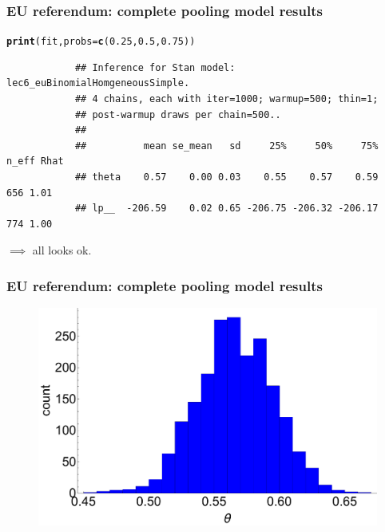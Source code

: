 \documentclass[handout]{beamer}
\makeatletter
\newcommand{\hlnum}[1]{\textcolor[rgb]{0.686,0.059,0.569}{#1}}%
\newcommand{\hlstd}[1]{\textcolor[rgb]{0.345,0.345,0.345}{#1}}%
\newcommand{\hlkwc}[1]{\textcolor[rgb]{0.333,0.667,0.333}{#1}}%
\newcommand{\hlkwd}[1]{\textcolor[rgb]{0.737,0.353,0.396}{\textbf{#1}}}%
\newenvironment{kframe}{%
	\def\at@end@of@kframe{}%
	\ifinner\ifhmode%
	\def\at@end@of@kframe{\end{minipage}}%
\begin{minipage}{\columnwidth}%
	\fi\fi%
	\def\FrameCommand##1{\hskip\@totalleftmargin \hskip-\fboxsep
		\colorbox{shadecolor}{##1}\hskip-\fboxsep
		\hskip-\linewidth \hskip-\@totalleftmargin \hskip\columnwidth}%
	\MakeFramed {\advance\hsize-\width
		\@totalleftmargin\z@ \linewidth\hsize
		\@setminipage}}%
{\par\unskip\endMakeFramed%
	\at@end@of@kframe}
\newenvironment{knitrout}{}{} %
\makeatother
\begin{document}
\begin{frame}[fragile]
	\frametitle{EU referendum: complete pooling model results}
	\begin{knitrout}\scriptsize
		\color{fgcolor}\begin{kframe}
			\begin{alltt}
				\hlkwd{print}\hlstd{(fit,}\hlkwc{probs} \hlstd{=} \hlkwd{c}\hlstd{(}\hlnum{0.25}\hlstd{,} \hlnum{0.5}\hlstd{,} \hlnum{0.75}\hlstd{))}
			\end{alltt}
			\begin{verbatim}
			## Inference for Stan model: lec6_euBinomialHomgeneousSimple.
			## 4 chains, each with iter=1000; warmup=500; thin=1; 
			## post-warmup draws per chain=500..
			## 
			##          mean se_mean   sd     25%     50%     75% n_eff Rhat
			## theta    0.57    0.00 0.03    0.55    0.57    0.59   656 1.01
			## lp__  -206.59    0.02 0.65 -206.75 -206.32 -206.17   774 1.00
			\end{verbatim}
		\end{kframe}
	\end{knitrout}
	
	$\implies$ all looks ok.
\end{frame}

\begin{frame}
	\frametitle{EU referendum: complete pooling model results}
	\begin{figure}[ht]
		\centerline{\includegraphics[width=1\linewidth]{figures/lec6_euHomogeneousPosterior.pdf} }
	\end{figure}
\end{frame}
\end{document}
